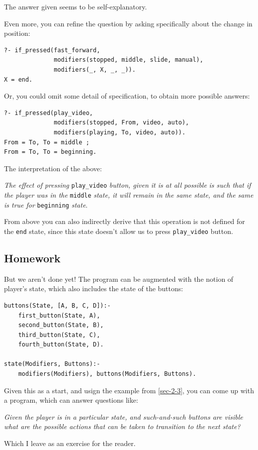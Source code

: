 \documentclass[11pt]{article}
\begin{document}
The answer given seems to be self-explanatory.

Even more, you can refine the question by asking specifically about the
change in position:

\begin{verbatim}
?- if_pressed(fast_forward,
              modifiers(stopped, middle, slide, manual),
              modifiers(_, X, _, _)).
X = end.
\end{verbatim}

Or, you could omit some detail of specification, to obtain more possible
answers:

\begin{verbatim}
?- if_pressed(play_video,
              modifiers(stopped, From, video, auto),
              modifiers(playing, To, video, auto)).
From = To, To = middle ;
From = To, To = beginning.
\end{verbatim}

The interpretation of the above:

\emph{The effect of pressing} \texttt{play\_video} \emph{button, given it is at all possible}
\emph{is such that if the player was in the} \texttt{middle} \emph{state, it will remain in}
\emph{the same state, and the same is true for} \texttt{beginning} \emph{state}.

From above you can also indirectly derive that this operation is not defined
for the \texttt{end} state, since this state doesn't allow us to press \texttt{play\_video}
button.
\subsection{Homework}
\label{sec-2-5}

But we aren't done yet!  The program can be augmented with the notion of
player's state, which also includes the state of the buttons:

\begin{verbatim}
buttons(State, [A, B, C, D]):-
    first_button(State, A),
    second_button(State, B),
    third_button(State, C),
    fourth_button(State, D).

state(Modifiers, Buttons):-
    modifiers(Modifiers), buttons(Modifiers, Buttons).
\end{verbatim}

Given this as a start, and usign the example from \ref{sec-2-3}, you can come
up with a program, which can answer questions like:

\emph{Given the player is in a particular state, and such-and-such buttons are visible}
\emph{what are the possible actions that can be taken to transition to the next state?}

Which I leave as an exercise for the reader.
\end{document}
